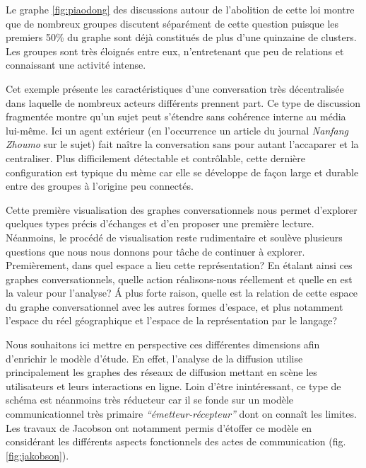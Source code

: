 Le graphe \ref{fig:piaodong} des discussions autour de l{\textquoteright}abolition de cette loi montre que de nombreux groupes discutent séparément de cette question puisque les premiers 50\% du graphe sont déjà constitués de plus d{\textquoteright}une quinzaine de clusters. Les groupes sont très éloignés entre eux, n{\textquoteright}entretenant que peu de relations et connaissant une activité intense.


Cet exemple présente les caractéristiques d{\textquoteright}une conversation très décentralisée dans laquelle de nombreux acteurs différents prennent part. Ce type de discussion fragmentée montre qu{\textquoteright}un sujet peut s{\textquoteright}étendre sans cohérence interne au média lui-m\^eme. Ici un agent extérieur (en l{\textquoteright}occurrence un article du journal \textit{Nanfang Zhoumo }sur le sujet) fait na\^itre la conversation sans pour autant l{\textquoteright}accaparer et la centraliser. Plus difficilement détectable et contr\^olable, cette dernière configuration est typique du mème car elle se développe de fa\c{c}on large et durable entre des groupes à l{\textquoteright}origine peu connectés.

Cette première visualisation des graphes conversationnels nous permet d{\textquoteright}explorer quelques types précis d{\textquoteright}échanges et d{\textquoteright}en proposer une première lecture. Néanmoins, le procédé de visualisation reste rudimentaire et soulève plusieurs questions que nous nous donnons pour t\^ache de continuer à explorer. Premièrement, dans quel espace a lieu cette représentation? En étalant ainsi ces graphes conversationnels, quelle action réalisons-nous réellement et quelle en est la valeur pour l{\textquoteright}analyse? \'A plus forte raison, quelle est la relation de cette espace du graphe conversationnel avec les autres formes d{\textquoteright}espace, et plus notamment l{\textquoteright}espace du réel géographique et l{\textquoteright}espace de la représentation par le langage?

Nous souhaitons ici mettre en perspective ces différentes dimensions afin d{\textquoteright}enrichir le modèle d{\textquoteright}étude. En effet, l{\textquoteright}analyse de la diffusion utilise principalement les graphes des réseaux de diffusion mettant en scène les utilisateurs et leurs interactions en ligne. Loin d{\textquoteright}\^etre inintéressant, ce type de schéma est néanmoins très réducteur car il se fonde sur un modèle communicationnel très primaire \textit{{\textquotedblleft}émetteur-récepteur{\textquotedblright} }dont on conna\^it les limites. Les travaux de Jacobson ont notamment permis d{\textquoteright}étoffer ce modèle en considérant les différents aspects fonctionnels des actes de communication (fig. \ref{fig:jakobson}).


